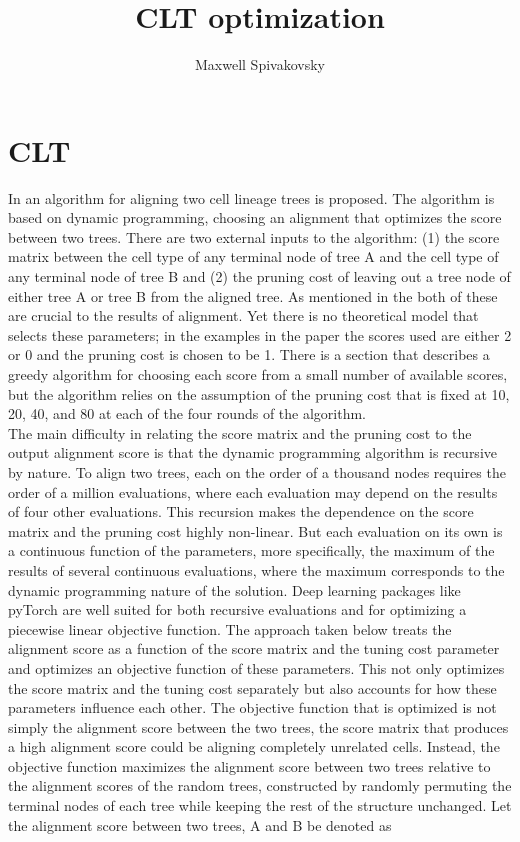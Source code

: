 \documentclass[12pt]{article}
\title{CLT optimization}
\author{Maxwell Spivakovsky}
\begin{document}
\maketitle
\section{CLT}
In \cite{CLT} an algorithm for aligning two cell lineage trees is proposed. The algorithm is based on dynamic programming, choosing an alignment that optimizes the score between two trees. There are two external inputs to the algorithm: (1) the score matrix between the cell type of any terminal node of tree A and the cell type of any terminal node of tree B and (2) the pruning cost of leaving out a tree node of either tree A or tree B from the aligned tree. As mentioned in the \cite{CLT} both of these are crucial to the results of alignment. Yet there is no theoretical model that selects these parameters; in the examples in the paper the scores used are either 2 or 0 and the pruning cost is chosen to be 1. There is a section that describes a greedy algorithm for choosing each score from a small number of available scores, but the algorithm relies on the assumption of the pruning cost that is fixed at 10, 20, 40, and 80 at each of the four rounds of the algorithm. \\
The main difficulty in relating the score matrix and the pruning cost to the output alignment score is that the dynamic programming algorithm is recursive by nature. To align two trees, each on the order of a thousand nodes requires the order of a million evaluations, where each evaluation may depend on the results of four other evaluations. This recursion makes the dependence on the score matrix and the pruning cost highly non-linear. But each evaluation on its own is a continuous function of the parameters, more specifically, the maximum of the results of several continuous evaluations, where the maximum corresponds to the dynamic programming nature of the solution. Deep learning packages like pyTorch are well suited for both recursive evaluations and for optimizing a piecewise linear objective function. The approach taken below treats the alignment score as a function of the score matrix and the tuning cost parameter and optimizes an objective function of these parameters. This not only optimizes the score matrix and the tuning cost separately but also accounts for how these parameters influence each other. The objective function that is optimized is not simply the alignment score between the two trees, the score matrix that produces a high alignment score could be aligning completely unrelated cells. Instead, the objective function maximizes the alignment score between two trees relative to the alignment scores of the random trees, constructed by randomly permuting the terminal nodes of each tree while keeping the rest of the structure unchanged. Let the alignment score between two trees, A and B be denoted as
\end{document}
